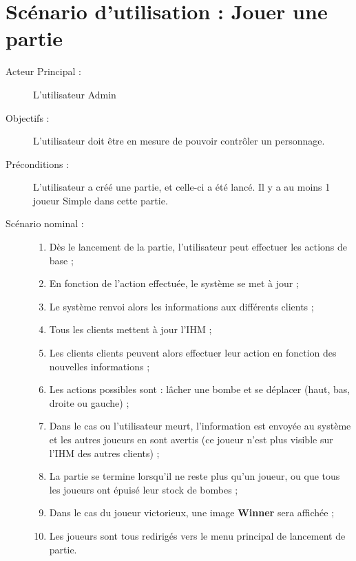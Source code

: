 \section{Scénario d'utilisation : Jouer une partie}

\begin{description}
 \item [Acteur Principal : ] L'utilisateur Admin
 \item [Objectifs : ] L'utilisateur doit être en mesure de pouvoir contrôler un personnage.
 \item [Préconditions : ] L'utilisateur a créé une partie, et celle-ci a été lancé. Il y a au moins 1 joueur Simple dans cette partie.
 \item [Scénario nominal : ] 
 \begin{enumerate}
   \item Dès le lancement de la partie, l'utilisateur peut effectuer les actions de base ;
   \item En fonction de l'action effectuée, le système se met à jour ;
   \item Le système renvoi alors les informations aux différents clients ;
   \item Tous les clients mettent à jour l'IHM ;
   \item Les clients clients peuvent alors effectuer leur action en fonction des nouvelles informations ;
   \item Les actions possibles sont : lâcher une bombe et se déplacer (haut, bas, droite ou gauche) ;
   \item Dans le cas ou l'utilisateur meurt, l'information est envoyée au système et les autres joueurs en sont avertis (ce joueur n'est plus visible sur l'IHM des autres clients) ;
   \item La partie se termine lorsqu'il ne reste plus qu'un joueur, ou que tous les joueurs ont épuisé leur stock de bombes ;
   \item Dans le cas du joueur victorieux, une image \textbf{Winner} sera affichée ;
   \item Les joueurs sont tous redirigés vers le menu principal de lancement de partie.
 \end{enumerate}

\end{description}


